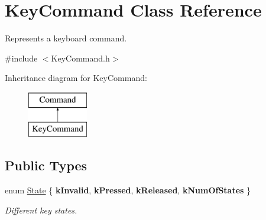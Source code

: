 \hypertarget{class_key_command}{}\section{Key\+Command Class Reference}
\label{class_key_command}


Represents a keyboard command.  




{\ttfamily \#include $<$Key\+Command.\+h$>$}

Inheritance diagram for Key\+Command\+:\begin{figure}[H]
\begin{center}
\leavevmode
\includegraphics[height=2.000000cm]{class_key_command}
\end{center}
\end{figure}
\subsection*{Public Types}
\begin{DoxyCompactItemize}
\item 
\mbox{\label{class_key_command_abd933bd3181a248c86fdd38801647e92}} 
enum \mbox{\hyperlink{class_key_command_abd933bd3181a248c86fdd38801647e92}{State}} \{ {\bfseries k\+Invalid}, 
{\bfseries k\+Pressed}, 
{\bfseries k\+Released}, 
{\bfseries k\+Num\+Of\+States}
 \}
\begin{DoxyCompactList}\small\item\em Different key states. \end{DoxyCompactList}\end{DoxyCompactItemize}
